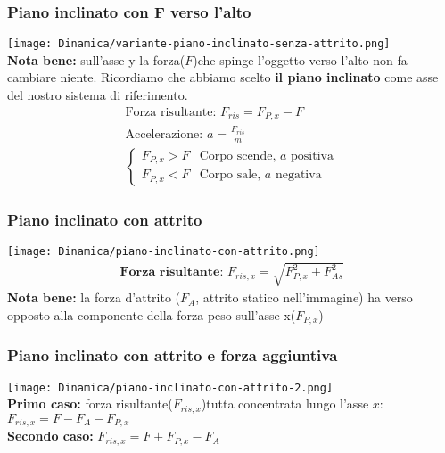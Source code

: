         \subsubsection{Piano inclinato con F verso l'alto}
\texttt{[image: Dinamica/variante-piano-inclinato-senza-attrito.png]} \\
\textbf{Nota bene: } sull'asse y la forza($F$)che spinge l'oggetto verso l'alto non fa cambiare niente. Ricordiamo che abbiamo scelto \textbf{il piano inclinato} come asse del nostro sistema di riferimento.
\begin{gather*}
    \text{Forza risultante: } F_{ris} = F_{P, x} - F \\
    \text{Accelerazione: } a = \frac{F_{ris}}{m} \\
    \begin{cases}
        F_{P, x} > F & \text{Corpo scende, $a$ positiva} \\
        F_{P, x} < F & \text{Corpo sale, $a$ negativa}
    \end{cases}
\end{gather*}

\subsubsection{Piano inclinato con attrito}
\texttt{[image: Dinamica/piano-inclinato-con-attrito.png]} \\
\begin{gather*}
    \textbf{Forza risultante: } F_{ris, x} = \sqrt{F_{P, x}^2 + F_{As}^2}
\end{gather*}
\textbf{Nota bene: } la forza d'attrito ($F_{A}$, attrito statico nell'immagine) ha verso opposto alla componente della forza peso sull'asse x($F_{P, x}$)
\subsubsection{Piano inclinato con attrito e forza aggiuntiva}
\texttt{[image: Dinamica/piano-inclinato-con-attrito-2.png]} \\
\textbf{Primo caso: } forza risultante($F_{ris, x}$)tutta concentrata lungo l'asse $x$: $F_{ris, x} = F - F_A - F_{P, x}$ \\
\textbf{Secondo caso: } $F_{ris, x} = F + F_{P, x} - F_A$ \\

